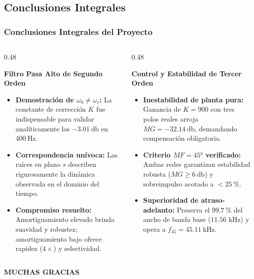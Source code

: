 \documentclass[aspectratio=169, 10pt]{beamer}
\begin{document}
\subsection{Conclusiones Integrales}
\begin{frame}
  \frametitle{Conclusiones Integrales del Proyecto}

  \begin{columns}[t, onlytextwidth]
    \begin{column}{0.48\textwidth}
      \begin{tarjeta}
        {\fontsize{9pt}{11pt}\selectfont \textbf{\color{NavyDark} Filtro Pasa Alto de Segundo Orden}}\\[2pt]
        {\fontsize{8pt}{10pt}\selectfont
        \begin{itemize}\setlength{\itemsep}{2.5pt}
          \item \textbf{Demostración de $\omega_0 \neq \omega_c$:} La constante de corrección $K$ fue indispensable para validar analíticamente los $\qty{-3.01}{\decibel}$ en $\qty{400}{\hertz}$.
          \item \textbf{Correspondencia unívoca:} Las raíces en plano $s$ describen rigurosamente la dinámica observada en el dominio del tiempo.
          \item \textbf{Compromiso resuelto:} Amortiguamiento elevado brinda suavidad y robustez; amortiguamiento bajo ofrece rapidez ($4\times$) y selectividad.
        \end{itemize}
        }
      \end{tarjeta}
    \end{column}

    \begin{column}{0.48\textwidth}
      \begin{tarjeta}
        {\fontsize{9pt}{11pt}\selectfont \textbf{\color{NavyDark} Control y Estabilidad de Tercer Orden}}\\[2pt]
        {\fontsize{8pt}{10pt}\selectfont
        \begin{itemize}\setlength{\itemsep}{2.5pt}
          \item \textbf{Inestabilidad de planta pura:} Ganancia de $K=900$ con tres polos reales arroja $MG = \qty{-32.14}{\decibel}$, demandando compensación obligatoria.
          \item \textbf{Criterio $MF = \ang{45}$ verificado:} Ambas redes garantizan estabilidad robusta ($MG \ge \qty{6}{\decibel}$) y sobreimpulso acotado a $< \qty{25}{\percent}$.
          \item \textbf{Superioridad de atraso-adelanto:} Preserva el $\qty{99.7}{\percent}$ del ancho de banda base ($11.56\text{ kHz}$) y opera a $f_{45} = \qty{45.11}{\kilo\hertz}$.
        \end{itemize}
        }
      \end{tarjeta}
    \end{column}
  \end{columns}
\end{frame}

\begin{frame}[plain]
  \vspace{3.2cm}
  \begin{center}
    {\fontsize{28pt}{34pt}\selectfont \textbf{\color{NavyDark} MUCHAS GRACIAS}}
  \end{center}
\end{frame}
\end{document}
